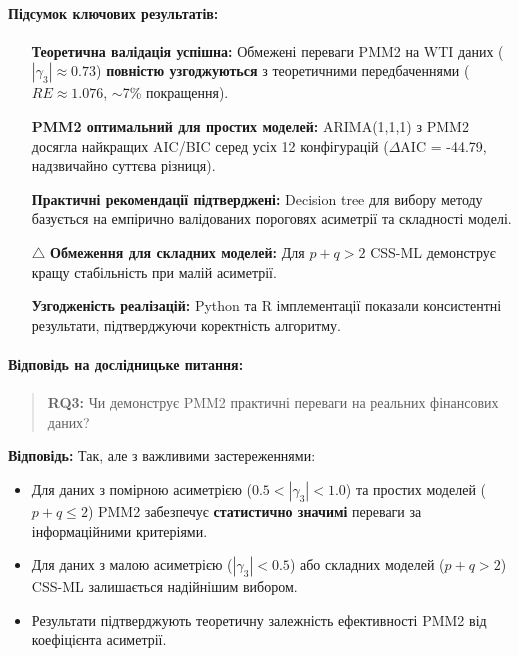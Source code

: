 \documentclass[12pt,a4paper]{article}
\begin{document}
\paragraph{Підсумок ключових результатів:}

\begin{enumerate}
    \item[\checkmark] \textbf{Теоретична валідація успішна:} Обмежені переваги PMM2 на WTI даних ($|\gamma_3| \approx 0.73$) \textbf{повністю узгоджуються} з теоретичними передбаченнями ($RE \approx 1.076$, $\sim$7\% покращення).

    \item[\checkmark] \textbf{PMM2 оптимальний для простих моделей:} ARIMA(1,1,1) з PMM2 досягла найкращих AIC/BIC серед усіх 12 конфігурацій ($\Delta$AIC = -44.79, надзвичайно суттєва різниця).

    \item[\checkmark] \textbf{Практичні рекомендації підтверджені:} Decision tree для вибору методу базується на емпірично валідованих пороговях асиметрії та складності моделі.

    \item[$\triangle$] \textbf{Обмеження для складних моделей:} Для $p+q > 2$ CSS-ML демонструє кращу стабільність при малій асиметрії.

    \item[\checkmark] \textbf{Узгодженість реалізацій:} Python та R імплементації показали консистентні результати, підтверджуючи коректність алгоритму.
\end{enumerate}

\paragraph{Відповідь на дослідницьке питання:}

\begin{quote}
\textbf{RQ3:} Чи демонструє PMM2 практичні переваги на реальних фінансових даних?
\end{quote}

\noindent\textbf{Відповідь:} Так, але з важливими застереженнями:
\begin{itemize}
    \item Для даних з помірною асиметрією ($0.5 < |\gamma_3| < 1.0$) та простих моделей ($p+q \leq 2$) PMM2 забезпечує \textbf{статистично значимі} переваги за інформаційними критеріями.
    \item Для даних з малою асиметрією ($|\gamma_3| < 0.5$) або складних моделей ($p+q > 2$) CSS-ML залишається надійнішим вибором.
    \item Результати підтверджують теоретичну залежність ефективності PMM2 від коефіцієнта асиметрії.
\end{itemize}
\end{document}
